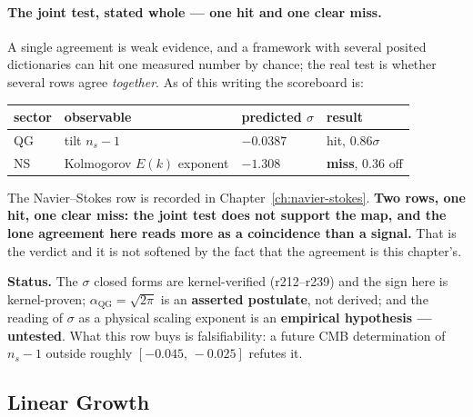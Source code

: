\begin{remark}
\paragraph{The joint test, stated whole --- one hit and one clear miss.}
A single agreement is weak evidence, and a framework with several posited
dictionaries can hit one measured number by chance; the real test is whether
several rows agree \emph{together}. As of this writing the scoreboard is:
\begin{center}
\begin{tabular}{llll}
\textbf{sector} & \textbf{observable} & \textbf{predicted $\sigma$} &
\textbf{result} \\
\hline
QG & tilt $n_s - 1$ & $-0.0387$ & hit, $0.86\sigma$ \\
NS & Kolmogorov $E(k)$ exponent & $-1.308$ & \textbf{miss}, $0.36$ off \\
\end{tabular}
\end{center}
The Navier--Stokes row is recorded in Chapter~\ref{ch:navier-stokes}. \textbf{Two
rows, one hit, one clear miss: the joint test does not support the map, and the
lone agreement here reads more as a coincidence than a signal.} That is the
verdict and it is not softened by the fact that the agreement is this
chapter's.

\noindent \textbf{Status.} The $\sigma$ closed forms are kernel-verified
(r212--r239) and the sign here is kernel-proven; $\alpha_{\text{QG}} =
\sqrt{2\pi}$ is an \textbf{asserted postulate}, not derived; and the reading of
$\sigma$ as a physical scaling exponent is an \textbf{empirical hypothesis ---
untested}. What this row buys is falsifiability: a future CMB determination of
$n_s - 1$ outside roughly $[-0.045,\,-0.025]$ refutes it.
\end{remark}

\subsection{Linear Growth}

